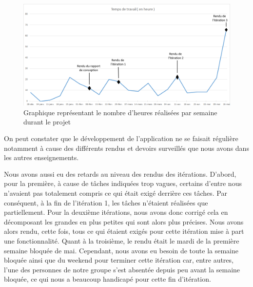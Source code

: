 	\begin{figure}[H]
        \centering
        \includegraphics[width=\textwidth]{figure/iteration.png}
            \caption{Graphique représentant le nombre d'heures réalisées par semaine durant le projet}
            \label{grapheHeure}
    \end{figure}


On peut constater que le développement de l'application ne se faisait régulière notamment à cause des différents rendus et devoirs surveillés que nous avons dans les autres enseignements.  


Nous avons aussi eu des retards au niveau des rendus des itérations. D'abord, pour la première, à cause de tâches indiquées trop vagues, certains d'entre nous n'avaient pas totalement compris ce qui était exigé derrière ces tâches. Par conséquent, à la fin de l'itération 1, les tâches n'étaient réalisées que partiellement. Pour la deuxième itérations, nous avons donc corrigé cela en décomposant les grandes en plus petites qui sont alors plus précises. Nous avons alors rendu, cette fois, tous ce qui étaient exigés pour cette itération mise à part une fonctionnalité. Quant à la troisième, le rendu était le mardi de la première semaine bloquée de mai. Cependant, nous avons eu besoin de toute la semaine bloquée ainsi que du weekend pour terminer cette itération car, entre autres, l'une des personnes de notre groupe s'est absentée depuis peu avant la semaine bloquée, ce qui nous a beaucoup handicapé pour cette fin d'itération.      